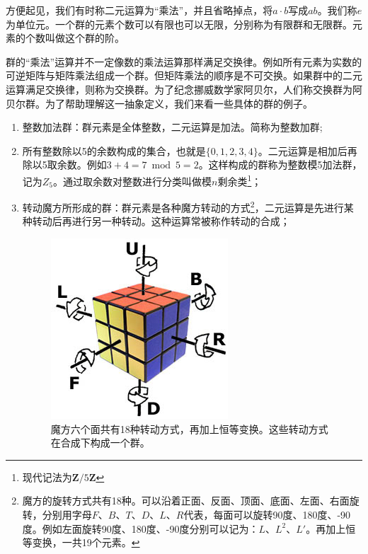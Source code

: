 \documentclass[b5paper]{ctexart}
\begin{document}
方便起见，我们有时称二元运算为“乘法”，并且省略掉点，将$a \cdot b$写成$ab$。我们称$e$为单位元。一个群的元素个数可以有限也可以无限，分别称为有限群和无限群。元素的个数叫做这个群的阶。

群的“乘法”运算并不一定像数的乘法运算那样满足交换律。例如所有元素为实数的可逆矩阵与矩阵乘法组成一个群。但矩阵乘法的顺序是不可交换。如果群中的二元运算满足交换律，则称为交换群。为了纪念挪威数学家阿贝尔，人们称交换群为阿贝尔群。为了帮助理解这一抽象定义，我们来看一些具体的群的例子。

\begin{enumerate}
\item 整数加法群：群元素是全体整数，二元运算是加法。简称为整数加群;
\item 所有整数除以5的余数构成的集合，也就是$\{0, 1, 2, 3, 4\}$。二元运算是相加后再除以5取余数。例如$3 + 4 = 7 \bmod 5 = 2$。这样构成的群称为整数模5加法群，记为$Z_5$。通过取余数对整数进行分类叫做模$n$剩余类\footnote{现代记法为$\pmb{Z}/5\pmb{Z}$}；
\item 转动魔方所形成的群：群元素是各种魔方转动的方式\footnote{魔方的旋转方式共有18种。可以沿着正面、反面、顶面、底面、左面、右面旋转，分别用字母$F$、$B$、$T$、$D$、$L$、$R$代表，每面可以旋转90度、180度、-90度。例如左面旋转90度、180度、-90度分别可以记为：$L$、$L^2$、$L'$\cite{Wiki-Rubik-Cube-group}。再加上恒等变换，一共19个元素。}，二元运算是先进行某种转动后再进行另一种转动。这种运算常被称作转动的合成；

\begin{figure}[htbp]
 \centering
 \includegraphics[scale=0.6]{img/Rubik_cube_notation.jpg}
 \caption{魔方六个面共有18种转动方式，再加上恒等变换。这些转动方式在合成下构成一个群。}
 \label{fig:Rubik-cube-notation}
\end{figure}


\end{enumerate}
\end{document}
